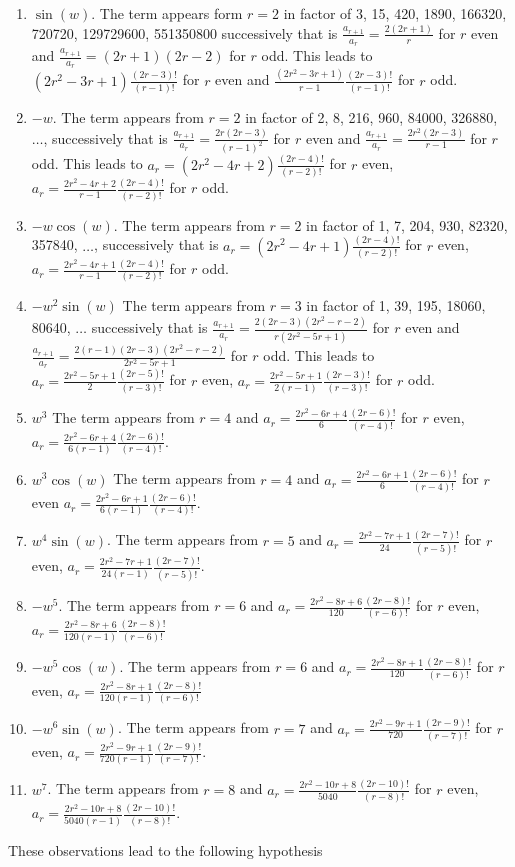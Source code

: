 \documentclass[a4paper, 11pt]{article}
\begin{document}
\begin{itemize}
\begin{enumerate}
      \item $\sin(w)$.
        The term appears form $r=2$ in factor of 3, 15, 420, 1890, 166320, 720720, 129729600, 551350800 successively 
	that is $\frac{a_{r+1}}{a_r} = \frac{2(2r+1)}{r}$ for $r$ even and $\frac{a_{r+1}}{a_r} = (2r+1)(2r-2)$ for $r$ 
	odd. This leads to $(2r^2-3r+1)\frac{(2r-3)!}{(r-1)!}$ for $r$ even and 
	$\frac{(2r^2-3r+1)}{r-1}\frac{(2r-3)!}{(r-1)!}$ for $r$ odd.
      \item $-w$.
        The term appears from $r=2$ in factor of 2, 8, 216, 960, 84000, 326880, $\ldots$, successively that is 
	$\frac{a_{r+1}}{a_r} = \frac{2r(2r-3)}{{(r-1)}^2}$ for $r$ even and $\frac{a_{r+1}}{a_r} = 
	\frac{2r^2(2r-3)}{r-1}$ for $r$ odd. This leads to $a_{r}=(2r^2-4r+2)\frac{(2r-4)!}{(r-2)!}$ for $r$ even, 
	$a_{r} = \frac{2r^2-4r+2}{r-1}\frac{(2r-4)!}{(r-2)!}$ for $r$ odd.
      \item $-w\cos(w)$.
	The term appears from $r=2$ in factor of 1, 7, 204, 930, 82320, 357840, $\ldots$, successively that is 
	$a_{r}=(2r^2-4r+1)\frac{(2r-4)!}{(r-2)!}$ for $r$ even, $a_{r} = \frac{2r^2-4r+1}{r-1}\frac{(2r-4)!}{(r-2)!}$ 
	for $r$ odd.
      \item $-w^2\sin(w)$
	The term appears from $r=3$ in factor of 1, 39, 195, 18060, 80640, $\ldots$ successively that is 
	$\frac{a_{r+1}}{a_r} = \frac{2(2r-3)(2r^2-r-2)}{r(2r^2-5r+1)}$ for $r$ even and $\frac{a_{r+1}}{a_r} = 
	\frac{2(r-1)(2r-3)(2r^2-r-2)}{2r^2-5r+1}$ for $r$ odd. This leads to $a_r = \frac{2r^2-5r+1}{2} 
	\frac{(2r-5)!}{(r-3)!}$ for $r$ even, $a_r =  \frac{2r^2-5r+1}{2(r-1)} \frac{(2r-3)!}{(r-3)!}$ for $r$ odd.
      \item $w^3$ The term appears from $r=4$ and $a_r = \frac{2r^2-6r+4}{6}\frac{(2r-6)!}{(r-4)!}$ for $r$ even, $a_r = 
	\frac{2r^2-6r+4}{6(r-1)}\frac{(2r-6)!}{(r-4)!}$.
      \item $w^3\cos(w)$ The term appears from $r=4$ and $a_r = \frac{2r^2-6r+1}{6}\frac{(2r-6)!}{(r-4)!}$ for $r$ even 
	$a_r=\frac{2r^2-6r+1}{6(r-1)}\frac{(2r-6)!}{(r-4)!}$.
      \item $w^4\sin(w)$. The term appears from $r=5$ and $a_r = \frac{2r^2-7r+1}{24}\frac{(2r-7)!}{(r-5)!}$ for $r$ 
	even, $a_r =  \frac{2r^2-7r+1}{24(r-1)}\frac{(2r-7)!}{(r-5)!}$.
      \item $-w^5$. The term appears from $r=6$ and $a_r = \frac{2r^2-8r+6}{120}\frac{(2r-8)!}{(r-6)!}$ for $r$ even, 
	$a_r =  \frac{2r^2-8r+6}{120(r-1)}\frac{(2r-8)!}{(r-6)!}$
      \item $-w^5\cos(w)$. The term appears from $r=6$ and $a_r = \frac{2r^2-8r+1}{120}\frac{(2r-8)!}{(r-6)!}$ for $r$ 
	even, $a_r =  \frac{2r^2-8r+1}{120(r-1)}\frac{(2r-8)!}{(r-6)!}$
      \item $-w^6\sin(w)$. The term appears from $r=7$ and $a_r = \frac{2r^2-9r+1}{720}\frac{(2r-9)!}{(r-7)!}$ for $r$ 
	even, $a_r = \frac{2r^2-9r+1}{720(r-1)}\frac{(2r-9)!}{(r-7)!}$.
      \item $w^7$. The term appears from $r=8$ and $a_r = \frac{2r^2-10r+8}{5040}\frac{(2r-10)!}{(r-8)!}$ for $r$ even, 
	$a_r = \frac{2r^2-10r+8}{5040(r-1)}\frac{(2r-10)!}{(r-8)!}$.
 \end{enumerate}
    These observations lead to the following hypothesis
    

\end{itemize}
\end{document}
